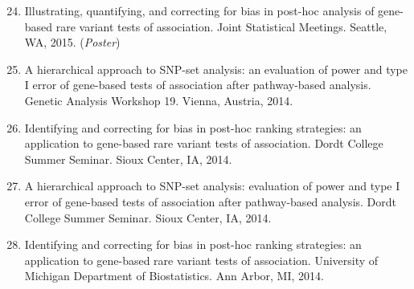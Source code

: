 \documentclass[margin]{res}
\newenvironment{benumerate}[1]{
    \let\oldItem\item
    \def\item{\addtocounter{enumi}{-2}\oldItem}
    
    \begin{enumerate}
    \setcounter{enumi}{#1}
    \addtocounter{enumi}{1}
}{
    \end{enumerate}
}
\begin{document}
\begin{resume}
\begin{benumerate}{23}



\item %
Illustrating, quantifying, and correcting for bias in post-hoc analysis of gene-based rare variant tests of association. Joint Statistical Meetings. Seattle, WA, 2015. (\textit{Poster})


\item %
A hierarchical approach to SNP-set analysis: an evaluation of power and type I error of gene-based tests of association after pathway-based analysis. Genetic Analysis Workshop 19. Vienna, Austria, 2014.

\item %
Identifying and correcting for bias in post-hoc ranking strategies: an application to gene-based rare variant tests of association. Dordt College Summer Seminar. Sioux Center, IA, 2014.

\item %
A hierarchical approach to SNP-set analysis: evaluation of power and type I error of gene-based tests of association after pathway-based analysis. Dordt College Summer Seminar. Sioux Center, IA, 2014.

\item %
Identifying and correcting for bias in post-hoc ranking strategies: an application to gene-based rare variant tests of association. University of Michigan Department of Biostatistics. Ann Arbor, MI, 2014.


\end{benumerate}
\end{resume}
\end{document}
